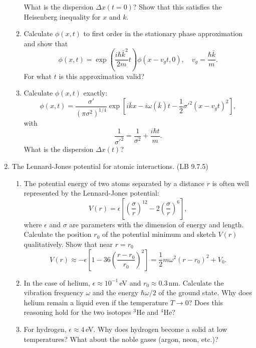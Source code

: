\documentclass[letterpaper,11pt]{article}
\begin{document}
\begin{enumerate}
\begin{enumerate}
    What is the dispersion $\Delta x(t = 0)$? Show that this satisfies the Heisenberg inequality for $x$ and $k$.
    \item Calculate $\phi(x,t)$ to first order in the stationary phase approximation and show that
    $$ \phi(x,t) = \exp\left( \frac{i\hbar\bar{k}^2}{2m} t \right) \phi(x - v_g t, 0), \quad v_g = \frac{\hbar \bar{k}}{m}.$$
    For what $t$ is this approximation valid?
    \item Calculate $\phi(x,t)$ exactly:
    $$ \phi(x,t) = \frac{\sigma'}{(\pi \sigma^2)^{1/4}} \exp \left[ i \bar{k} x - i \omega(\bar{k}) t - \frac{1}{2} \sigma'^2 (x - v_g t)^2 \right], $$
    with
    $$ \frac{1}{\sigma'^2} = \frac{1}{\sigma^2} + \frac{i\hbar t}{m}. $$
    What is the dispersion $\Delta x(t)$?
  \end{enumerate}
  \item The Lennard-Jones potential for atomic interactions. (LB 9.7.5)
  \begin{enumerate}
    \item The potential energy of two atoms separated by a distance $r$ is often well represented by the Lennard-Jones potential:
    $$ V(r) = \epsilon \left[ \left( \frac{\sigma}{r} \right)^{12} - 2 \left( \frac{\sigma}{r} \right)^{6} \right], $$
    where $\epsilon$ and $\sigma$ are parameters with the dimension of energy and length. Calculate the position $r_0$ of the potential minimum and sketch $V(r)$ qualitatively. Show that near $r = r_0$
    $$ V(r) \approx - \epsilon \left[ 1 - 36 \left( \frac{r - r_0}{r_0} \right)^2 \right] = \frac{1}{2} m \omega^2 (r - r_0)^2 + V_0. $$
    \item In the case of helium, $\epsilon \approx 10^{-1}$\,eV and $r_0 \approx 0.3$\,nm. Calculate the vibration frequency $\omega$ and the energy $\hbar \omega/2$ of the ground state. Why does helium remain a liquid even if the temperature $T \to 0$? Does this reasoning hold for the two isotopes $^3$He and $^4$He?
    \item For hydrogen, $\epsilon \approx 4$\,eV. Why does hydrogen become a solid at low temperatures? What about the noble gases (argon, neon, etc.)?
  \end{enumerate}
\end{enumerate}
\end{document}

